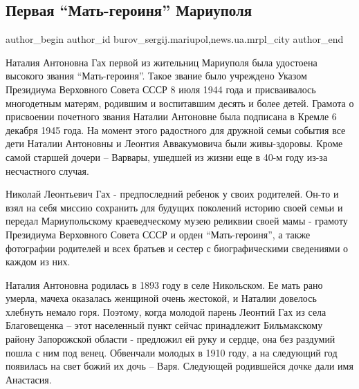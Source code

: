  
 
 
 
 
 
\subsection{Первая \enquote{Мать-героиня} Мариуполя}
\label{sec:08_07_2017.stz.news.ua.mrpl_city.1.pervaja_mat_geroinja_mariupolja}
 
\ifcmt
 author_begin
   author_id burov_sergij.mariupol,news.ua.mrpl_city
 author_end
\fi


Наталия Антоновна Гах первой из жительниц Мариуполя была удостоена высокого
звания \enquote{Мать-героиня}. Такое звание было учреждено Указом Президиума Верховного
Совета СССР 8 июля 1944 года и присваивалось многодетным матерям, родившим и
воспитавшим десять и более детей. Грамота о присвоении почетного звания
Наталии Антоновне была подписана в Кремле 6 декабря 1945 года. На момент этого
радостного для дружной семьи события все дети Наталии Антоновны и Леонтия
Аввакумовича были живы-здоровы. Кроме самой старшей дочери – Варвары, ушедшей
из жизни еще в 40-м году из-за несчастного случая.

Николай Леонтьевич Гах - предпоследний ребенок у своих родителей. Он-то и взял
на себя миссию сохранить для будущих поколений историю своей семьи и передал
Мариупольскому краеведческому музею реликвии своей мамы - грамоту Президиума
Верховного Совета СССР и орден \enquote{Мать-героиня}, а также фотографии родителей и
всех братьев и сестер с биографическими сведениями о каждом из них.

Наталия Антоновна родилась в 1893 году в селе Никольском. Ее мать рано умерла,
мачеха оказалась женщиной очень жестокой, и Наталии довелось хлебнуть немало
горя. Поэтому, когда молодой парень Леонтий Гах из села Благовещенка – этот
населенный пункт сейчас принадлежит  Бильмакскому району Запорожской области -
предложил ей руку и сердце, она без раздумий пошла с ним под венец. Обвенчали
молодых в 1910 году, а на следующий год появилась на свет божий их дочь – Варя.
Следующей родившейся дочке дали имя Анастасия.

